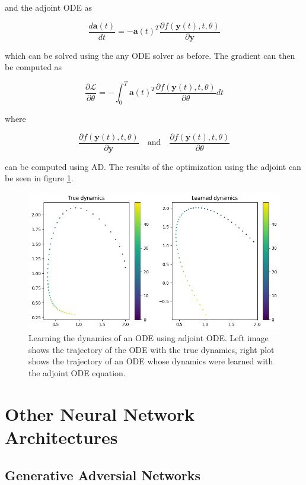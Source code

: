 \documentclass{article}
\begin{document}
{\begin{appendices}
and the adjoint ODE as

\begin{equation}
\frac{d\mathbf{a}(t)}{dt} = -\mathbf{a}(t)^T \frac{\partial f(\mathbf{y}(t), t, \theta)}{\partial \mathbf{y}}
\end{equation}

which can be solved using the any ODE solver as before. The gradient can then be computed as

\begin{equation}
\frac{\partial \mathcal{L}}{\partial \theta} = -\int_0^T \mathbf{a}(t) ^T \frac{\partial f(\mathbf{y}(t), t, \theta)}{\partial \theta} dt
\end{equation}

where 

\begin{equation}
\frac{\partial f(\mathbf{y}(t), t, \theta)}{\partial \mathbf{y}} \quad \text{and} \quad \frac{\partial f(\mathbf{y}(t), t, \theta)}{\partial \theta}
\end{equation}

can be computed using AD. The results of the optimization using the adjoint can be seen in figure \ref{fig:ode-adjoint}.


\begin{figure}[h]
    \centering
    \includegraphics[width=0.75\linewidth]{img/ode_learning.png}
    \caption{Learning the dynamics of an ODE using adjoint ODE. Left image shows the trajectory of the ODE with the true dynamics, right plot shows the trajectory of an ODE whose dynamics were learned with the adjoint ODE equation.}
    \label{fig:ode-adjoint}
\end{figure}

\newpage
\section{Other Neural Network Architectures}
\subsection{Generative Adversial Networks}
\label{CGAN}


\end{appendices}}
\end{document}
